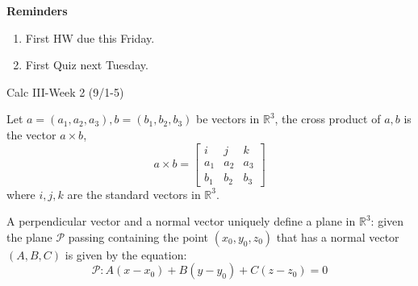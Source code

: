 \documentclass[openany]{book}
\newcommand{\R}{\mathbb{R}}
\begin{document}
\noindent
\textbf{Reminders}
\begin{enumerate}
    \item First HW due this Friday.
    \item First Quiz next Tuesday.
\end{enumerate}





\newpage



\begin{center}
    \Large Calc III-Week 2 (9/1-5)
\end{center}



\renewcommand\thesection{\arabic{section}}


\begin{defn}
    Let $a=(a_1,a_2,a_3), b=(b_1,b_2,b_3)$ be vectors in $\R^3$, the cross product of $a,b$ is the vector $a\times b$, 
    \begin{equation*}
        a\times b=\begin{bmatrix}
            i&j&k\\
            a_1&a_2&a_3\\
            b_1&b_2&b_3
        \end{bmatrix}
    \end{equation*}
    where $i,j,k$ are the standard vectors in $\R^3$.
\end{defn}

\begin{defn}
    A perpendicular vector and a normal vector uniquely define a plane in $\R^3$: given the plane $\mathcal{P}$ passing containing the point $(x_0,y_0,z_0)$ that has a normal vector $(A,B,C)$ is given by the equation:
    \begin{equation*}
        \mathcal{P}: A(x-x_0)+B(y-y_0)+C(z-z_0)=0
    \end{equation*}
\end{defn}
\end{document}
